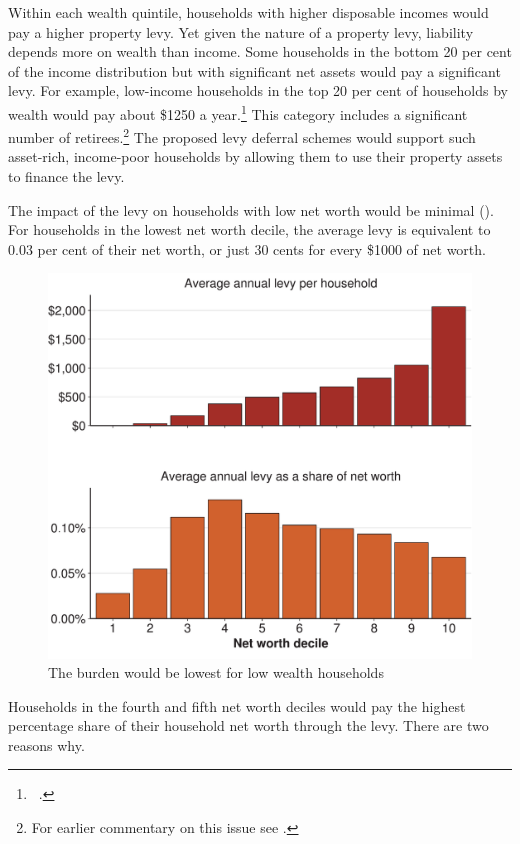 Within each wealth quintile, households with higher disposable incomes would pay a higher property levy. Yet given the nature of a property levy, liability depends more on wealth than income. Some households in the bottom 20 per cent of the income distribution but with significant net assets would pay a significant levy. For example, low-income households in the top 20 per cent of households by wealth would pay about \$1250 a year.\footnote{\gao\ \textcites{ABS2013t}{ABS2014e}.}  This category includes a significant number of retirees.\footnote{For earlier commentary on this issue see \textcites[][11]{HardingWarren1999}[][156--158]{productivity2008assessing}.}  The proposed levy deferral schemes would support such asset-rich, income-poor households by allowing them to use their property assets to finance the levy.

The impact of the levy on households with low net worth would be minimal (). For households in the lowest net worth decile, the average levy is equivalent to 0.03 per cent of their net worth, or just 30 cents for every \$1000 of net worth.  

\begin{figure}
\caption{The burden would be lowest for low wealth households\label{fig:PROP-12}}%
\includegraphics[width=\columnwidth]{Property-taxes/atlas/figure/Figure12-1.pdf}
\end{figure}

Households in the fourth and fifth net worth deciles would pay the highest percentage share of their household net worth through the levy. There are two reasons why.

